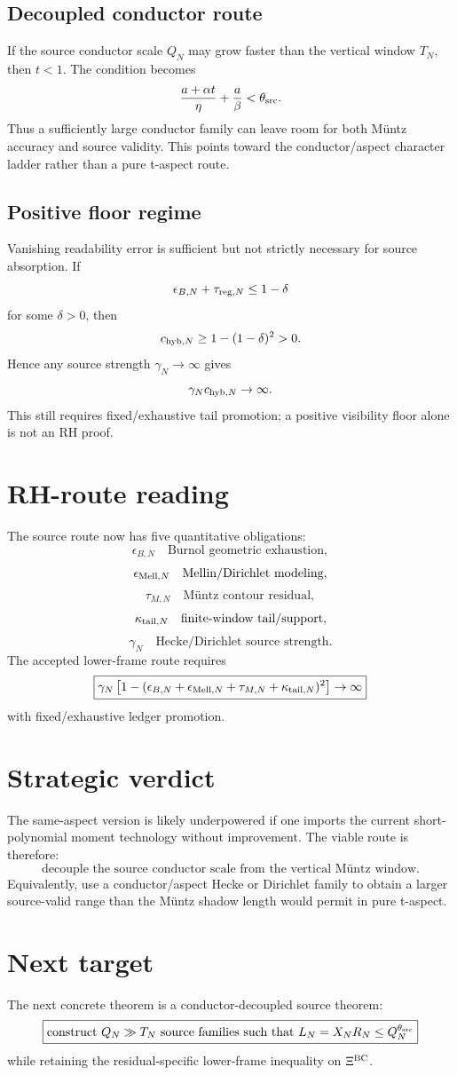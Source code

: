 \documentclass[11pt]{article}
\begin{document}
\subsection{Decoupled conductor route}
If the source conductor scale \(Q_N\) may grow faster than the vertical window \(T_N\), then \(t<1\).  The condition becomes
\[
\frac{a+\alpha t}{\eta}+\frac{a}{\beta}<\theta_{\rm src}.
\]
Thus a sufficiently large conductor family can leave room for both M\"untz accuracy and source validity.  This points toward the conductor/aspect character ladder rather than a pure t-aspect route.

\subsection{Positive floor regime}
Vanishing readability error is sufficient but not strictly necessary for source absorption.  If
\[
\epsilon_{B,N}+\tau_{{\rm reg},N}\le 1-\delta
\]
for some \(\delta>0\), then
\[
c_{{\rm hyb},N}\ge 1-(1-\delta)^2>0.
\]
Hence any source strength \(\gamma_N\to\infty\) gives
\[
\gamma_Nc_{{\rm hyb},N}\to\infty.
\]
This still requires fixed/exhaustive tail promotion; a positive visibility floor alone is not an RH proof.

\section{RH-route reading}
The source route now has five quantitative obligations:
\[
\epsilon_{B,N}\quad\text{Burnol geometric exhaustion},
\]
\[
\epsilon_{{\rm Mell},N}\quad\text{Mellin/Dirichlet modeling},
\]
\[
\tau_{M,N}\quad\text{M\"untz contour residual},
\]
\[
\kappa_{{\rm tail},N}\quad\text{finite-window tail/support},
\]
\[
\gamma_N\quad\text{Hecke/Dirichlet source strength}.
\]
The accepted lower-frame route requires
\[
\boxed{
\gamma_N\left[1-(\epsilon_{B,N}+\epsilon_{{\rm Mell},N}+\tau_{M,N}+\kappa_{{\rm tail},N})^2\right]\to\infty
}
\]
with fixed/exhaustive ledger promotion.

\section{Strategic verdict}
The same-aspect version is likely underpowered if one imports the current short-polynomial moment technology without improvement.  The viable route is therefore:
\[
\boxed{
\text{decouple the source conductor scale from the vertical M\"untz window.}
}
\]
Equivalently, use a conductor/aspect Hecke or Dirichlet family to obtain a larger source-valid range than the M\"untz shadow length would permit in pure t-aspect.

\section{Next target}
The next concrete theorem is a conductor-decoupled source theorem:
\[
\boxed{
\text{construct }Q_N\gg T_N\text{ source families such that }L_N=X_NR_N\le Q_N^{\theta_{\rm src}}
}
\]
while retaining the residual-specific lower-frame inequality on \(\Xi^{\rm BC}\).
\end{document}
